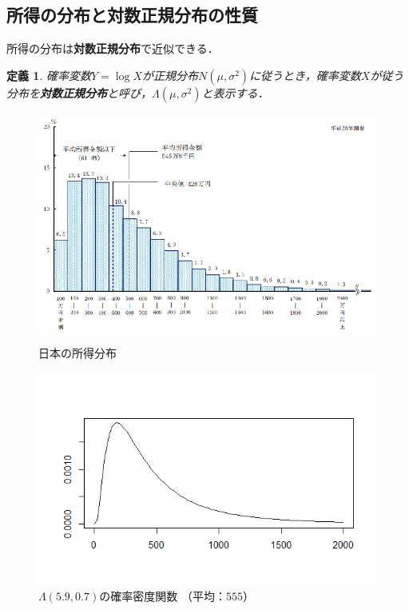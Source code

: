 \documentclass{jsarticle}
\newtheorem{dfn}{定義}[section]
\begin{document}
\subsection{所得の分布と対数正規分布の性質}
所得の分布は\textbf{対数正規分布}で近似できる．
\begin{dfn}
確率変数$Y=\log X$が正規分布$N(\mu, \sigma^2)$に従うとき，確率変数$X$が従う分布を\textbf{対数正規分布}と呼び，$\Lambda(\mu, \sigma^2)$と表示する．
\end{dfn}

\begin{figure}[htbp]
\centering
\begin{minipage}{0.52\columnwidth}
\centering
\includegraphics[width=\columnwidth]{figure2}
\caption{日本の所得分布 \cite{URL1}}
\end{minipage}
\begin{minipage}{0.47\columnwidth}
\centering
\includegraphics[width=\columnwidth]{figure3}
\caption{$\Lambda(5.9,0.7)$の確率密度関数 （平均：$555$）}
\end{minipage}
\end{figure}
\end{document}
